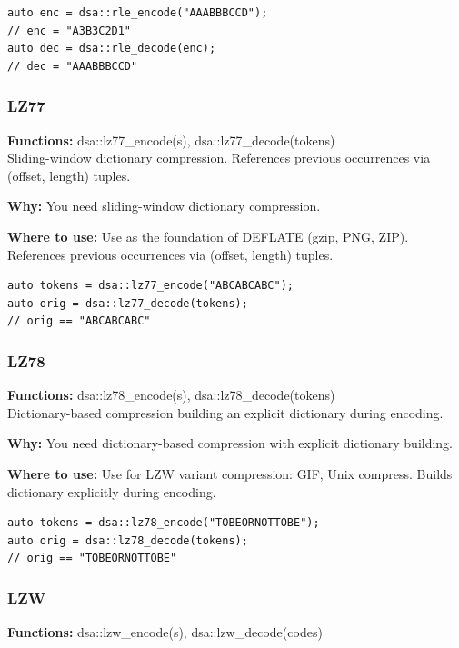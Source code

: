 \documentclass[11pt]{article}
\begin{document}
\begin{lstlisting}
auto enc = dsa::rle_encode("AAABBBCCD");
// enc = "A3B3C2D1"
auto dec = dsa::rle_decode(enc);
// dec = "AAABBBCCD"
\end{lstlisting}

\subsubsection{LZ77}
\textbf{Functions:} dsa::lz77\_encode(s), dsa::lz77\_decode(tokens)\\

Sliding-window dictionary compression. References previous occurrences via (offset, length) tuples.

\textbf{Why:} You need sliding-window dictionary compression. \par \textbf{Where to use:} Use as the foundation of DEFLATE (gzip, PNG, ZIP). References previous occurrences via (offset, length) tuples.

\begin{lstlisting}
auto tokens = dsa::lz77_encode("ABCABCABC");
auto orig = dsa::lz77_decode(tokens);
// orig == "ABCABCABC"
\end{lstlisting}

\subsubsection{LZ78}
\textbf{Functions:} dsa::lz78\_encode(s), dsa::lz78\_decode(tokens)\\

Dictionary-based compression building an explicit dictionary during encoding.

\textbf{Why:} You need dictionary-based compression with explicit dictionary building. \par \textbf{Where to use:} Use for LZW variant compression: GIF, Unix compress. Builds dictionary explicitly during encoding.

\begin{lstlisting}
auto tokens = dsa::lz78_encode("TOBEORNOTTOBE");
auto orig = dsa::lz78_decode(tokens);
// orig == "TOBEORNOTTOBE"
\end{lstlisting}

\subsubsection{LZW}
\textbf{Functions:} dsa::lzw\_encode(s), dsa::lzw\_decode(codes)\\
\end{document}
